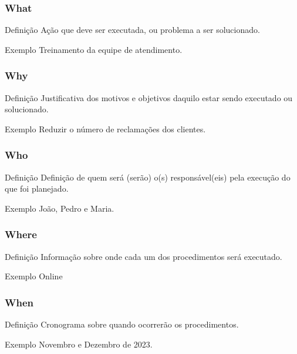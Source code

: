 \documentclass[aspectratio=169]{beamer}
\begin{document}
\begin{frame}
	\frametitle{What}

	\begin{block}{Defini\c cão}
		 Ação que deve ser executada, ou problema a ser solucionado.
	\end{block}\vfill
	
	\begin{exampleblock}{Exemplo}
		Treinamento da equipe de atendimento.
	\end{exampleblock}
\end{frame}

\begin{frame}
	\frametitle{Why}

	\begin{block}{Defini\c cão}
		 Justificativa dos motivos e objetivos daquilo estar sendo executado ou solucionado.
	\end{block}\vfill
	
	\begin{exampleblock}{Exemplo}
		Reduzir o número de reclama\c cões dos clientes.
	\end{exampleblock}
\end{frame}

\begin{frame}
	\frametitle{Who}

	\begin{block}{Defini\c cão}
		Definição de quem será (serão) o(s) responsável(eis) pela execução do que foi planejado.
	\end{block}\vfill
	
	\begin{exampleblock}{Exemplo}
		João, Pedro e Maria.
	\end{exampleblock}
\end{frame}

\begin{frame}
	\frametitle{Where}

	\begin{block}{Defini\c cão}
		 Informação sobre onde cada um dos procedimentos será executado.
	\end{block}\vfill
	
	\begin{exampleblock}{Exemplo}
		Online
	\end{exampleblock}
\end{frame}

\begin{frame}
	\frametitle{When}

	\begin{block}{Defini\c cão}
		 Cronograma sobre quando ocorrerão os procedimentos.
	\end{block}\vfill
	
	\begin{exampleblock}{Exemplo}
		Novembro e Dezembro de 2023.
	\end{exampleblock}
\end{frame}
\end{document}
